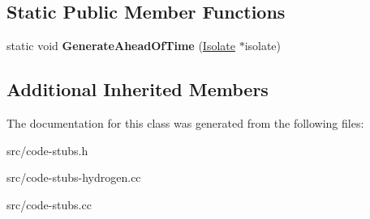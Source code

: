 \subsection*{Static Public Member Functions}
\begin{DoxyCompactItemize}
\item 
\hypertarget{classv8_1_1internal_1_1_create_allocation_site_stub_a4bcfe6fa5638dbcabd3309abe7e7a8d4}{}static void {\bfseries Generate\+Ahead\+Of\+Time} (\hyperlink{classv8_1_1internal_1_1_isolate}{Isolate} $\ast$isolate)\label{classv8_1_1internal_1_1_create_allocation_site_stub_a4bcfe6fa5638dbcabd3309abe7e7a8d4}

\end{DoxyCompactItemize}
\subsection*{Additional Inherited Members}


The documentation for this class was generated from the following files\+:\begin{DoxyCompactItemize}
\item 
src/code-\/stubs.\+h\item 
src/code-\/stubs-\/hydrogen.\+cc\item 
src/code-\/stubs.\+cc\end{DoxyCompactItemize}
